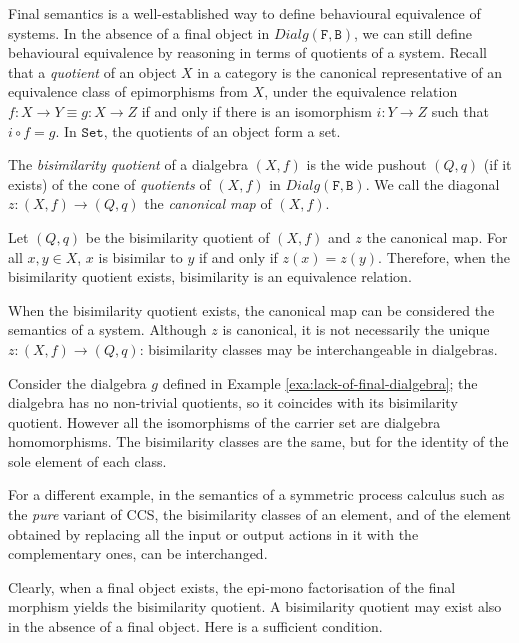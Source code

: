 \documentclass[orivec]{llncs}
\newcommand{\mC}[1]{\mathtt{#1}}
\newcommand{\mF}[1]{\mathtt{#1}}
\newcommand{\Set}{\mC{Set}}
\newcommand{\F}{\mF{F}}
\newcommand{\B}{\mF{B}}
\newcommand{\dialg}{\mathit{Dialg}}
\newcommand{\defend}{}
\renewenvironment{definition}{\begin{defn}}{\defend\end{defn}}
\begin{document}
Final semantics is a well-established way to define behavioural equivalence of systems. 
In the absence of a final object in $\dialg(\F,\B)$, we can still define behavioural equivalence by reasoning in terms of quotients of a system. Recall that a \emph{quotient} of an object $X$ in a category is the canonical representative of an equivalence class of epimorphisms from $X$, under the equivalence relation $f : X \to Y \equiv g : X \to Z$ if and only if there is an isomorphism $i : Y \to Z$ such that $i \circ f = g$. In $\Set$, the quotients of an object form a set. 

\begin{definition}
 The \emph{bisimilarity quotient} of a dialgebra $(X,f)$ is the wide pushout $(Q,q)$ (if it exists) of the cone of \emph{quotients} of $(X,f)$ in $\dialg(\F,\B)$. We call the diagonal $z : (X,f) \to (Q,q)$ the \emph{canonical map} of $(X,f)$.
\end{definition}

\begin{proposition}\label{pro:bisimilarity-equivalence}
	Let $(Q,q)$ be the bisimilarity quotient of $(X,f)$ and $z$ the canonical map. For all $x,y \in X$, $x$ is bisimilar to $y$ if and only if $z(x) = z(y)$. Therefore, when the bisimilarity quotient exists, bisimilarity is an equivalence relation.
\end{proposition}

When the bisimilarity quotient exists, the canonical map can be considered the semantics of a system. Although $z$ is canonical, it is not necessarily the unique $z : (X,f) \to (Q,q)$: bisimilarity classes may be interchangeable in dialgebras. 

\begin{example}Consider the dialgebra $g$ defined in Example \ref{exa:lack-of-final-dialgebra}; the dialgebra has no non-trivial quotients, so it coincides with its bisimilarity quotient. However all the isomorphisms of the carrier set are dialgebra homomorphisms. The bisimilarity classes are the same, but for the identity of the sole element of each class. 
\end{example}

For a different example, in the semantics of a symmetric process calculus such as the \emph{pure} variant of CCS, the bisimilarity classes of an element, and of the element obtained by replacing all the input or output actions in it with the complementary ones, can be interchanged.


Clearly, when a final object exists, the epi-mono factorisation of the final morphism yields the bisimilarity quotient. A bisimilarity quotient may exist also in the absence of a final object. Here is a sufficient condition.
\end{document}
